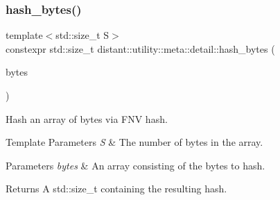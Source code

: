 \subsubsection{\texorpdfstring{hash\+\_\+bytes()}{hash\_bytes()}}
{\footnotesize\ttfamily template$<$std\+::size\+\_\+t S$>$ \\
constexpr std\+::size\+\_\+t distant\+::utility\+::meta\+::detail\+::hash\+\_\+bytes (\begin{DoxyParamCaption}\item[{const std\+::array$<$ unsigned char, S $>$ \&}]{bytes }\end{DoxyParamCaption})\hspace{0.3cm}{\ttfamily [noexcept]}}



Hash an array of bytes via F\+NV hash. 


\begin{DoxyTemplParams}{Template Parameters}
{\em S} & The number of bytes in the array. \\
\hline
\end{DoxyTemplParams}

\begin{DoxyParams}{Parameters}
{\em bytes} & An array consisting of the bytes to hash.\\
\hline
\end{DoxyParams}
\begin{DoxyReturn}{Returns}
A std\+::size\+\_\+t containing the resulting hash. 
\end{DoxyReturn}
